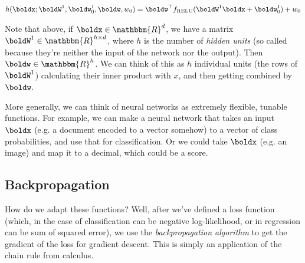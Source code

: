 \documentclass[12pt,letterpaper]{article}
\newcommand{\R}{\mathbbm{R}}
\newcommand{\1}{\mathbbm{1}}
\begin{document}
\begin{align}
    h(\boldx; \boldW^1, \boldw_0^1, \boldw, w_0) = \boldw^\top f_{\operatorname{RELU}}(\boldW^1 \boldx + \boldw_0^1) + w_0    
\end{align}

Note that above, if $\boldx \in \R^{d}$, we have a matrix $\boldW^1 \in \R^{h \times d}$, where $h$ is the number of \emph{hidden units} (so called because they're neither the input of the network nor the output). Then $\boldw \in \R^{h}$. We can think of this as $h$ individual units (the rows of $\boldW^1$) calculating their inner product with $x$, and then getting combined by $\boldw$. 


More generally, we can think of neural networks as extremely flexible, tunable functions. For example, we can make a neural network that takes an input $\boldx$ (e.g. a document encoded to a vector somehow) to a vector of class probabilities, and use that for classification. Or we could take $\boldx$ (e.g. an image) and map it to a decimal, which could be a score.

\subsection{Backpropagation}

How do we adapt these functions? Well, after we've defined a loss function (which, in the case of classification can be negative log-likelihood, or in regression can be sum of squared error), we use the \emph{backpropagation algorithm} to get the gradient of the loss for gradient descent. This is simply an application of the chain rule from calculus.
\end{document}

